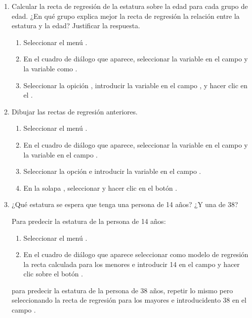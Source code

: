 \begin{enumerate}[leftmargin=*]
\begin{enumerate}
\item Calcular la recta de regresión de la estatura sobre la edad para cada grupo de edad. 
¿En qué grupo explica mejor la recta de regresión la relación entre la estatura y la edad? 
Justificar la respuesta.
\begin{indicacion}
\begin{enumerate}
\item Seleccionar el menú .
\item En el cuadro de diálogo que aparece, seleccionar la variable  en el campo  y la variable  como .
\item Seleccionar la opición , introducir la variable  en el campo
, y hacer clic en el .
\end{enumerate}
\end{indicacion}

\item Dibujar las rectas de regresión anteriores.
\begin{indicacion}
\begin{enumerate}
\item Seleccionar el menú .
\item En el cuadro de diálogo que aparece, seleccionar la variable  en el campo  y
la variable  en el campo .
\item Seleccionar la opción  e introducir la variable  en el campo
.
\item En la solapa , seleccionar  y hacer clic en el botón
.
\end{enumerate}
\end{indicacion}

\item ¿Qué estatura se espera que tenga una persona de 14 años? ¿Y una de 38?
\begin{indicacion}
Para predecir la estatura de la persona de 14 años:
\begin{enumerate}
\item Seleccionar el menú .
\item En el cuadro de diálogo que aparece seleccionar como modelo de regresión la recta calculada para los menores e
introducir 14 en el campo  y hacer clic sobre el botón
.
\end{enumerate}
para predecir la estatura de la persona de 38 años, repetir lo mismo pero seleccionando la recta de regresión para los
mayores e introducidento 38 en el campo .
\end{indicacion}
\end{enumerate}


\end{enumerate}
